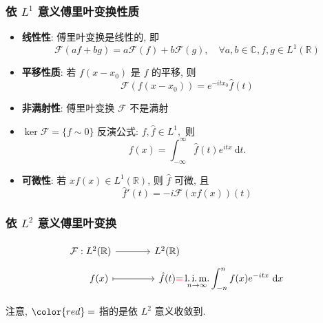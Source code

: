 \begin{frame}[fragile]
\frametitle{依 $L^1$ 意义傅里叶变换性质}

\begin{itemize}
\item \textbf{线性性}: 傅里叶变换是线性的, 即
\[
\mathcal{F}(af + bg) = a\mathcal{F}(f) + b\mathcal{F}(g), \quad \forall a,b \in \mathbb{C}, f,g \in L^1(\mathbb{R})
\]
\item \textbf{平移性质}: 若 $f(x - x_0)$ 是 $f$ 的平移, 则
\[
\mathcal{F}(f(x - x_0)) = e^{-i t x_0} \hat{f}(t)
\]
\item \textbf{非满射性}: 傅里叶变换 $\mathcal{F}$ 不是满射
\item $\ker \mathcal{F} = \{ f \sim 0 \}$  反演公式: $f, \hat{f} \in L^1,$ 则
\[
f(x) = \int_{-\infty}^{\infty} \hat{f}(t) e^{itx} ~ \mathrm{d} t.
\]
\item \textbf{可微性}: 若 $xf(x) \in L^1(\mathbb{R})$, 则 $\hat{f}$ 可微, 且
\[
\hat{f}'(t) = -i \mathcal{F}(x f(x))(t)
\]
\end{itemize}

\end{frame}


\begin{frame}[fragile]
\frametitle{依 $L^2$ 意义傅里叶变换}

\begin{Def}[依 $L^2$ 意义傅里叶变换]
\[
\begin{tikzcd}[column sep=large, row sep=tiny]
\mathcal{F}: L^2(\mathbb{R}) \arrow[r] & L^2(\mathbb{R}) \hspace{26ex} \\
\hspace{4ex} f(x) \arrow[mapsto, r] & \displaystyle \hat{f}(t) {\color{red}=} \mathop{\operatorname{l.i.m.}}\limits_{n\to\infty} \int_{-n}^{n} f(x) e^{-itx} ~ \mathrm{d} x
\end{tikzcd}
\]
\end{Def}

注意, ${\color{red}=}$ 指的是依 $L^2$ 意义收敛到.

\end{frame}


